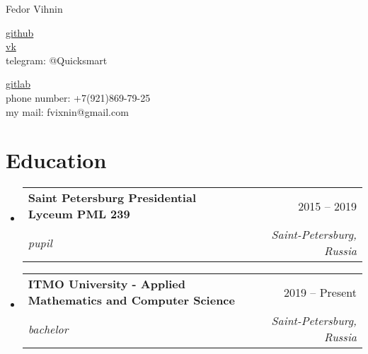 \documentclass[letterpaper,10pt]{article}
\makeatletter
\newcommand{\resumeSubheading}[4]{
  \vspace{-2pt}\item
    \begin{tabular*}{0.97\textwidth}[t]{l@{\extracolsep{\fill}}r}
      \textbf{#1} & #2 \\
      \textit{\small#3} & \textit{\small #4} \\
    \end{tabular*}\vspace{-7pt}
}
\newcommand{\resumeSubHeadingListStart}{\begin{itemize}[leftmargin=0.15in, label={}]}
\newcommand{\resumeSubHeadingListEnd}{\end{itemize}}
\makeatother
\begin{document}
\begin{center}
    {\LARGE Fedor Vihnin} \\ \vspace{2pt}
    \begin{multicols}{2}
    \begin{flushleft}
    \href{https://github.com/Brat-vseznamus}{github}\\
    \href{https://vk.com/looongboooi}{vk}\\
    telegram: @Quicksmart
    \end{flushleft}
    
    \begin{flushright}
    \href{https://gitlab.com/Brat-vseznamus}{gitlab}\\
    phone number: +7(921)869-79-25\\
    my mail: fvixnin@gmail.com
    \end{flushright}
    \end{multicols}
\end{center}


\vspace{-2pt}
\section{Education}
    \resumeSubHeadingListStart
        \resumeSubheading
        {Saint Petersburg Presidential Lyceum PML 239
        }{2015 -- 2019}
        {pupil}{Saint-Petersburg, Russia}

    \resumeSubHeadingListEnd
  \resumeSubHeadingListStart
      \resumeSubheading
      {ITMO University - Applied Mathematics and Computer Science}{2019 -- Present}
      {bachelor}{Saint-Petersburg, Russia}

  \resumeSubHeadingListEnd


\end{document}
